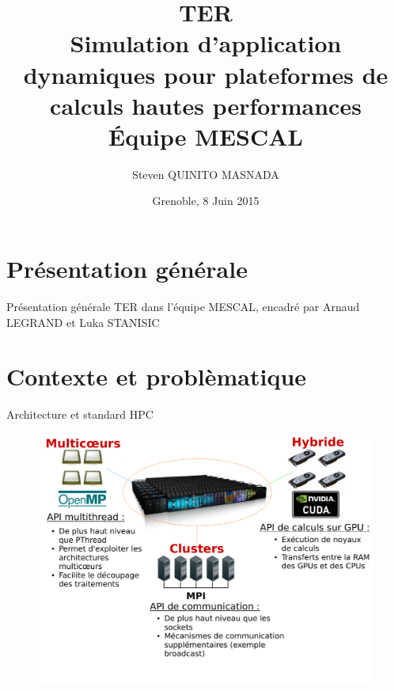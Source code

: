 \documentclass[11pt,xcolor=dvipsnames,presentation]{beamer}
\author{Steven QUINITO MASNADA}
\date{Grenoble, 8 Juin 2015}
\title{\textbf{TER} \\ Simulation d'application dynamiques pour plateformes de calculs hautes performances \bigskip\\ \large Équipe MESCAL}
\begin{document}
\maketitle


\section{Présentation générale}
\label{sec-1}
\begin{frame}[label=sec-1-1]{Présentation générale}
TER dans l'équipe MESCAL, encadré par Arnaud LEGRAND et Luka STANISIC 
\end{frame}
\section{Contexte et problèmatique}
\label{sec-2}
\begin{frame}[label=sec-2-1]{Architecture et standard HPC}
\begin{figure}[tbh]
\centering
\vspace{-1.5mm}
\includegraphics[width=\linewidth]{./Slides/Archi.pdf}
\end{figure}
\end{frame}
\end{document}
